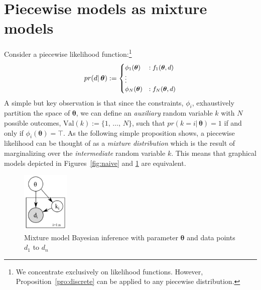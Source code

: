 \section{Piecewise models as mixture models}
\label{sect:mix}
Consider a piecewise likelihood function:\footnote{
We concentrate exclusively on likelihood functions. However, Proposition~\ref{pro:discrete} can be applied to any piecewise distribution. 
}%
\begin{equation}
\label{e:piecewise.likelihood22}
pr(d | \, \boldsymbol\theta) :=
{\footnotesize
\begin{cases}
\phi_1(\boldsymbol\theta)  &: f_1(\boldsymbol\theta, d)\\
\vdots\\
\phi_N(\boldsymbol\theta)  &: f_N(\boldsymbol\theta, d)
\end{cases}
}%
\end{equation} 
A simple but key observation is that since the constraints, $\phi_i$, exhaustively partition the space of $\boldsymbol \theta$,
we can define an \emph{auxiliary} random variable $k$ with $N$ possible outcomes, $\text{Val} (k) := \{1, \, \ldots, \, N\}$,
such that 
$pr(k = i |\, \boldsymbol\theta) = 1$ if and only if $\phi_i (\boldsymbol\theta) = \top$. %
As the following simple proposition shows,
a piecewise likelihood can be thought of as a \emph{mixture distribution} 
which is the result of marginalizing over the \emph{intermediate} random variable $k$.
This means that graphical models depicted in Figures~\ref{fig:naive} and \ref{fig:naive.mix} are equivalent.

\begin{figure}
  \centering
  \includegraphics[width=0.2\textwidth]{pic/naive-mix2.pdf}
\caption{Mixture model Bayesian inference with parameter $\boldsymbol\theta$ and data points $d_1$ to $d_n$}
  \label{fig:naive.mix}
\end{figure}

